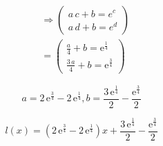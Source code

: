 {\[
\begin{aligned}
&\Rightarrow
\left(\begin{array}{c}
a\, c + b = e^c \\
a\, d + b = e^d
\end{array}\right) \\
&= \left(\begin{array}{c}
\frac{a}{4} + b = \mathrm{e}^{\frac{1}{4}}\\
\frac{3\, a}{4} + b = \mathrm{e}^{\frac{3}{4}}
\end{array}\right)
\end{aligned}
\]

\[
a = 2\, \mathrm{e}^{\frac{3}{4}} - 2\, \mathrm{e}^{\frac{1}{4}},b = \frac{3\, \mathrm{e}^{\frac{1}{4}}}{2} - \frac{\mathrm{e}^{\frac{3}{4}}}{2}
\]

\[
l(x) =
\left(2\, \mathrm{e}^{\frac{3}{4}} - 2\, \mathrm{e}^{\frac{1}{4}}\right) x +
\frac{3\, \mathrm{e}^{\frac{1}{4}}}{2} - \frac{\mathrm{e}^{\frac{3}{4}}}{2}
\]

}
